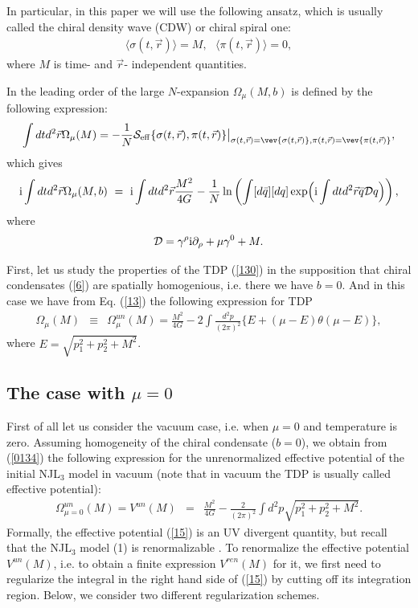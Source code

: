 \documentclass[12pt,a4paper]{article}
\begin{document}
In particular, in this paper we will
use the following ansatz, which is usually called the chiral density wave (CDW) \cite{nakano} or chiral spiral \cite{thies} one:
\begin{eqnarray}
\langle\sigma(t,\vec r)\rangle=M,~~~\langle\pi(t,\vec r)\rangle=0, \label{6}
\end{eqnarray}
where $M$ is time- and $\vec r$- independent quantities.


In the leading order of the large $N$-expansion $\Omega_\mu (M,b)$ is defined by the following expression:
\begin{equation}
\int dtd^2\vec r \Omega_\mu (M)=-\frac{1}{N}{\cal S}_{\rm {eff}}\{\sigma(t,\vec r),\pi(t,\vec r)\}\big|_{\sigma (t,\vec r)=\vev{\sigma(t,\vec r)},\pi(t,\vec r)=\vev{\pi(t,\vec r)}} ,
\end{equation}
which gives
\begin{equation}
\mathrm{i}\int dtd^2\vec r\Omega_\mu (M,b)\,\,=\,\,\mathrm{i}\int
dtd^2\vec r\frac{M^2}{4G}-\frac{1}{N}\ln\left (
\int [d\bar q][dq]\exp\Bigl(\mathrm{i}\int dtd^2\vec r
\bar q {\cal D} q \Bigr)\right ),
\label{8}
\end{equation}
where
\begin{equation}
{\cal D}=\gamma^\rho\mathrm{i}\partial_\rho +\mu\gamma^0+
M.\label{9}
\end{equation}

First, let us study the properties of the TDP (\ref{130}) in the supposition that chiral condensates (\ref{6}) are spatially homogenious, i.e. there we have $b=0$. And in this case we have from Eq. (\ref{13}) the following expression for TDP
\begin{eqnarray}
\Omega_\mu(M)&
\equiv & \Omega^{un}_\mu(M)=\frac{M^2}{4G}-2\int\frac{d^2p}{
(2\pi)^2}\Big\{E+(\mu-E)\theta (\mu-E)\Big\},
\label{0134}
\end{eqnarray}
where $E=\sqrt{p_1^2+p_2^2+M^2}$. %

\subsection{The case with $\mu=0$}
\label{IIIA}

First of all let us consider the vacuum case, i.e. when
$\mu=0$ and temperature is zero.  Assuming homogeneity of
the chiral condensate ($b=0$), we obtain from (\ref{0134}) the
following expression for the unrenormalized effective potential of the initial
NJL$_3$ model in vacuum (note that in vacuum the TDP is usually called effective potential):
 \begin{eqnarray}
\Omega_{\mu=0}^{un}(M)=V^{un}(M)&=&\frac{M^2}{4G}-
\frac{2}{(2\pi)^2}\int d^2p\sqrt{p_1^2+p_2^2+M^2}.
\label{15}
\end{eqnarray}
Formally, the effective potential (\ref{15}) is an UV
divergent quantity, but recall that the NJL$_3$ model (1) is renormalizable \cite{rosenstein}. To renormalize the effective potential
$V^{un}(M)$, i.e. to obtain a finite expression $V^{ren}(M)$ for it, we first
need to regularize the integral in the right hand side of (\ref{15})
by cutting off its integration region. Below, we consider two
different regularization schemes.
\end{document}
